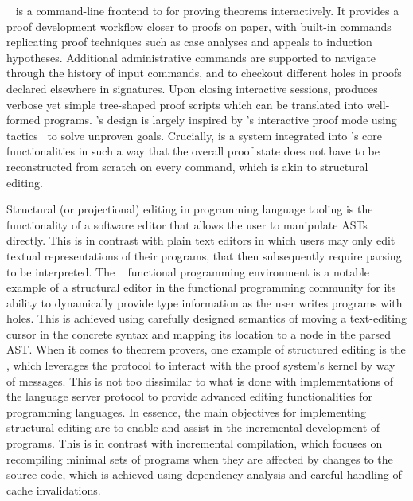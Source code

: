 
\Harpoon~\cite{errington2021harpoon} is a command-line frontend to \Beluga for proving theorems interactively.
It provides a proof development workflow closer to proofs on paper, with built-in commands replicating proof techniques such as case analyses and appeals to induction hypotheses.
Additional administrative commands are supported to navigate through the history of input commands, and to checkout different holes in proofs declared elsewhere in \Beluga signatures.
Upon closing interactive sessions, \Harpoon produces verbose yet simple tree-shaped proof scripts which can be translated into well-formed \Beluga programs.
\Harpoon's design is largely inspired by \Coq's interactive proof mode using tactics~\cite{delahaye2000tactic} to solve unproven goals.
Crucially, \Harpoon is a system integrated into \Beluga's core functionalities in such a way that the overall proof state does not have to be reconstructed from scratch on every command, which is akin to structural editing.


Structural (or projectional) editing in programming language tooling is the functionality of a software editor that allows the user to manipulate \acp{AST} directly.
This is in contrast with plain text editors in which users may only edit textual representations of their programs, that then subsequently require parsing to be interpreted.
The \Hazel~\cite{omar2017hazelnut, omar2019live} functional programming environment is a notable example of a structural editor in the functional programming community for its ability to dynamically provide type information as the user writes programs with holes.
This is achieved using carefully designed semantics of moving a text-editing cursor in the concrete syntax and mapping its location to a node in the parsed \ac{AST}.
When it comes to theorem provers, one example of structured editing is the \CoqIDE, which leverages the \Coq \XML protocol to interact with the proof system's kernel by way of messages.
This is not too dissimilar to what is done with implementations of the language server protocol to provide advanced editing functionalities for programming languages.
In essence, the main objectives for implementing structural editing are to enable and assist in the incremental development of programs.
This is in contrast with incremental compilation, which focuses on recompiling minimal sets of programs when they are affected by changes to the source code, which is achieved using dependency analysis and careful handling of cache invalidations.

